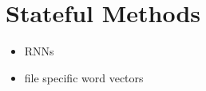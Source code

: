 \section{Stateful Methods}

\begin{itemize}
  \item RNNs
  \item file specific word vectors
\end{itemize}
